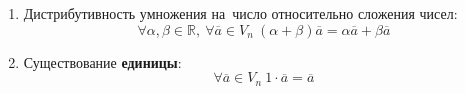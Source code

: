 \begin{enumerate}
	\item Дистрибутивность умножения на~число относительно сложения чисел:
	\begin{equation*}
	\forall \alpha, \beta \in \mathbb R, \ 
	\forall \overline a \in V_n \ 
	(\alpha + \beta) \overline a = \alpha \overline a + \beta \overline a
	\end{equation*}
	
	\item Существование \textbf{единицы}:
	\begin{equation*}
	\forall \overline a \in V_n \ 
	1 \cdot \overline a = \overline a
	\end{equation*}
\end{enumerate}